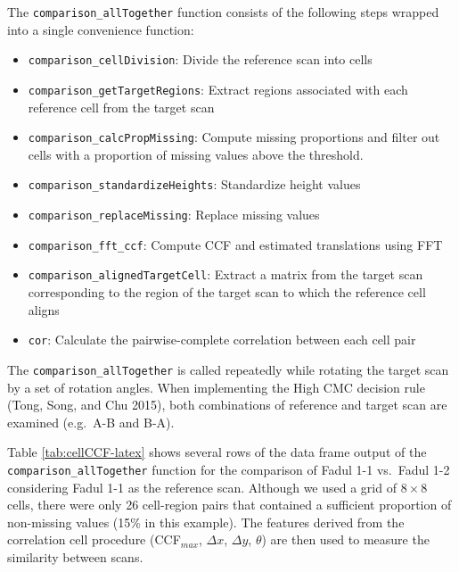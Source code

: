 The \texttt{comparison\_allTogether} function consists of the following steps wrapped into a single convenience function:

\begin{itemize}
\tightlist
\item
  \texttt{comparison\_cellDivision}: Divide the reference scan into cells
\item
  \texttt{comparison\_getTargetRegions}: Extract regions associated with each reference cell from the target scan
\item
  \texttt{comparison\_calcPropMissing}: Compute missing proportions and filter out cells with a proportion of missing values above the threshold.
\item
  \texttt{comparison\_standardizeHeights}: Standardize height values
\item
  \texttt{comparison\_replaceMissing}: Replace missing values
\item
  \texttt{comparison\_fft\_ccf}: Compute CCF and estimated translations using FFT
\item
  \texttt{comparison\_alignedTargetCell}: Extract a matrix from the target scan corresponding to the region of the target scan to which the reference cell aligns
\item
  \texttt{cor}: Calculate the pairwise-complete correlation between each cell pair
\end{itemize}

The \texttt{comparison\_allTogether} is called repeatedly while rotating the target scan by a set of rotation angles.
When implementing the High CMC decision rule (Tong, Song, and Chu 2015), both combinations of reference and target scan are examined (e.g.~A-B and B-A).

Table \ref{tab:cellCCF-latex} shows several rows of the data frame output of the \texttt{comparison\_allTogether} function for the comparison of Fadul 1-1 vs.~Fadul 1-2 considering Fadul 1-1 as the reference scan.
Although we used a grid of \(8 \times 8\) cells, there were only 26 cell-region pairs that contained a sufficient proportion of non-missing values (15\% in this example).
The features derived from the correlation cell procedure (CCF\(_{max}\), \(\Delta x\), \(\Delta y\), \(\theta\)) are then used to measure the similarity between scans.

